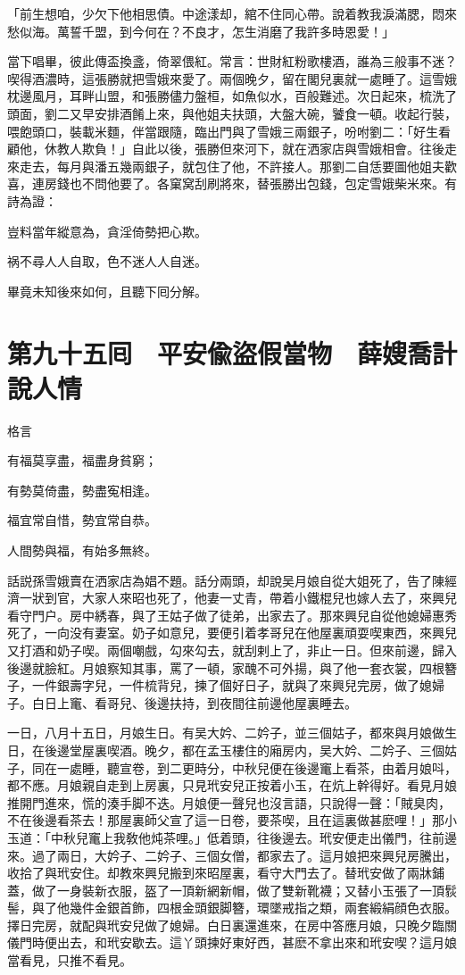 「前生想咱，少欠下他相思債。中途漾却，綰不住同心帶。說着教我淚滿腮，悶來愁似海。萬誓千盟，到今何在？不良才，怎生消磨了我許多時恩愛！」

當下唱畢，彼此傳盃換盞，倚翠偎紅。常言：世財紅粉歌樓酒，誰為三般事不迷？喫得酒濃時，這張勝就把雪娥來愛了。兩個晚夕，留在閣兒裏就一處睡了。這雪娥枕邊風月，耳畔山盟，和張勝儘力盤桓，如魚似水，百般難述。次日起來，梳洗了頭面，劉二又早安排酒餚上來，與他姐夫扶頭，大盤大碗，饕食一頓。收起行裝，喂飽頭口，裝載米麵，伴當跟隨，臨出門與了雪娥三兩銀子，吩咐劉二：「好生看顧他，休教人欺負！」自此以後，張勝但來河下，就在洒家店與雪娥相會。往後走來走去，每月與潘五幾兩銀子，就包住了他，不許接人。那劉二自恁要圖他姐夫歡喜，連房錢也不問他要了。各窠窝刮刷將來，替張勝出包錢，包定雪娥柴米來。有詩為證：

豈料當年縱意為，貪淫倚勢把心欺。

祸不尋人人自取，色不迷人人自迷。

畢竟未知後來如何，且聽下囘分解。

\chapter*{第九十五囘　平安偸盜假當物　薛嫂喬計說人情}

格言

有福莫享盡，福盡身貧窮；

有勢莫倚盡，勢盡寃相逢。

福宜常自惜，勢宜常自恭。

人間勢與福，有始多無終。

話説孫雪娥賣在洒家店為娼不題。話分兩頭，却說吴月娘自從大姐死了，告了陳經濟一狀到官，大家人來昭也死了，他妻一丈青，帶着小鐵棍兒也嫁人去了，來興兒看守門户。房中綉春，與了王姑子做了徒弟，出家去了。那來興兒自從他媳婦惠秀死了，一向没有妻室。奶子如意兒，要便引着孝哥兒在他屋裏頑耍喫東西，來興兒又打酒和奶子喫。兩個嘲戲，勾來勾去，就刮剌上了，非止一日。但來前邊，歸入後邊就臉紅。月娘察知其事，罵了一頓，家醜不可外揚，與了他一套衣裳，四根簪子，一件銀壽字兒，一件梳背兒，揀了個好日子，就與了來興兒完房，做了媳婦子。白日上竃、看哥兒、後邊扶持，到夜間往前邊他屋裏睡去。

一日，八月十五日，月娘生日。有吴大妗、二妗子，並三個姑子，都來與月娘做生日，在後邊堂屋裏喫酒。晚夕，都在孟玉樓住的廂房内，吴大妗、二妗子、三個姑子，同在一處睡，聽宣卷，到二更時分，中秋兒便在後邊竃上看茶，由着月娘呌，都不應。月娘親自走到上房裏，只見玳安兒正按着小玉，在炕上幹得好。看見月娘推開門進來，慌的湊手脚不迭。月娘便一聲兒也沒言語，只說得一聲：「賊臭肉，不在後邊看茶去！那屋裏師父宣了這一日卷，要茶喫，且在這裏做甚麽哩！」那小玉道：「中秋兒竃上我敎他炖茶哩。」低着頭，往後邊去。玳安便走出儀門，往前邊來。過了兩日，大妗子、二妗子、三個女僧，都家去了。這月娘把來興兒房騰出，收拾了與玳安住。却教來興兒搬到來昭屋裏，看守大門去了。替玳安做了兩牀鋪蓋，做了一身裝新衣服，盔了一頂新網新帽，做了雙新靴襪；又替小玉張了一頂䯼髻，與了他幾件金銀首飾，四根金頭銀脚簪，環墜戒指之類，兩套緞絹顔色衣服。擇日完房，就配與玳安兒做了媳婦。白日裏還進來，在房中答應月娘，只晚夕臨關儀門時便出去，和玳安歇去。這丫頭揀好東好西，甚麽不拿出來和玳安喫？這月娘當看見，只推不看見。

